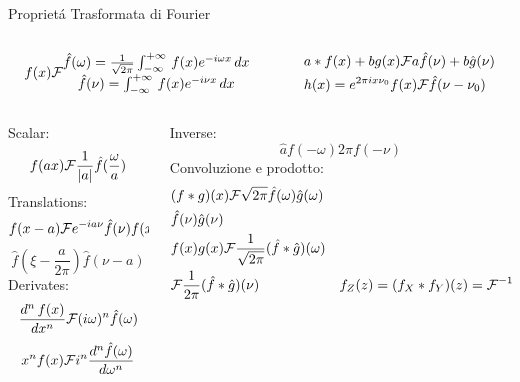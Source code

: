 \documentclass[asd-beamer.tex]{subfiles}
\begin{document}
\begin{wordonframe}{Propriet\'a Trasformata di Fourier}
\begin{columns}
\begin{column}{0.5\textwidth}
\begin{align*}
f(x)\mathcal{F}{}\begin{matrix}
\hat{f}(\omega)=\frac{1}{\sqrt{2\pi}}\int_{-\infty}^{+\infty}\,f(x)e^{-i\omega x}\,dx\\
\hat{f}(\nu)=\int_{-\infty}^{+\infty}\,f(x)e^{-i\nu x}\,dx\\
\end{matrix}
\end{align*}
\end{column}
\begin{column}{0.5\textwidth}
\begin{align*}
&a*f(x)+bg(x)\mathcal{F}{}a\hat{f}(\nu)+b\hat{g}(\nu)\\
&h(x)=e^{2\pi ix\nu_0}f(x)\mathcal{F}{}\hat{f}(\nu-\nu_0)
\end{align*}
\end{column}
\end{columns}
\begin{columns}
\begin{column}{0.5\textwidth}
Scalar: \[f(ax)\mathcal{F}{}\frac{1}{|a|}\hat{f}(\frac{\omega}{a}) \]
Translations:
\[f(x-a)\mathcal{F}{}e^{-ia\nu}\hat{f}(\nu)f(x)e^{iax}\]
\[\hat{f}(\xi-\frac{a}{2\pi}) \hat{f}(\nu-a)\]
Derivates:
\[\frac{d^n\,f(x)}{dx^n}\mathcal{F}{}(i\omega)^n\hat{f}(\omega)\]
\[x^nf(x)\mathcal{F}{}i^n\frac{d^n\hat{f}(\omega)}{d\omega^n}\]
\end{column}
\begin{column}{0.5\textwidth}
Inverse: \[\hat{a} f(-\omega) 2\pi f(-\nu)\]
Convoluzione e prodotto:
\begin{align*}
&(f*g)(x)\mathcal{F}{}\sqrt{2\pi}\hat{f}(\omega)\hat{g}(\omega)\\
&\hat{f}(\nu)\hat{g}(\nu)\\
&f(x)g(x)\mathcal{F}{}\frac{1}{\sqrt{2\pi}}(\hat{f}*\hat{g})(\omega)\\
&\mathcal{F}{}\frac{1}{2\pi}(\hat{f}*\hat{g})(\nu)
&f_Z(z)=(f_X*f_Y)(z)={\mathcal{F}{}}^{-1}{[\mathcal{F}{[f_X]}\mathcal{F}{[f_Y]}]}
\end{align*}

\end{column}
\end{columns}
\end{wordonframe}
\end{document}
